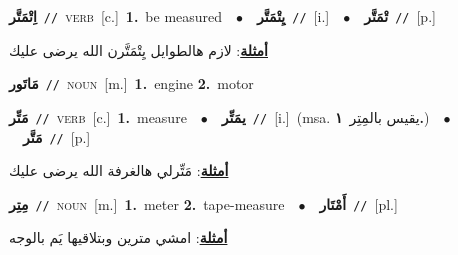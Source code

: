 \documentclass[10pt,a4paper,twoside]{article} %
\begin{document}
\begin{multicols}{2}
{{\setlength\topsep{0pt}\textbf{\foreignlanguage{arabic}{اِتْمَتَّر}}\ {\color{gray}\texttt{//}\color{black}}\ \textsc{verb}\ [c.]\ \textbf{1.}~be measured\ \ $\bullet$\ \ \setlength\topsep{0pt}\textbf{\foreignlanguage{arabic}{يِتْمَتَّر}}\ {\color{gray}\texttt{//}\color{black}}\ [i.]\ \ $\bullet$\ \ \setlength\topsep{0pt}\textbf{\foreignlanguage{arabic}{تْمَتَّر}}\ {\color{gray}\texttt{//}\color{black}}\ [p.]\  \begin{flushright}\color{gray}\foreignlanguage{arabic}{\textbf{\underline{\foreignlanguage{arabic}{أمثلة}}}: لازم هالطوايل يِتْمَتَّرن الله يرضى عليك}\end{flushright}\color{black}} \vspace{2mm}

{\setlength\topsep{0pt}\textbf{\foreignlanguage{arabic}{مَاتَور}}\ {\color{gray}\texttt{//}\color{black}}\ \textsc{noun}\ [m.]\ \textbf{1.}~engine  \textbf{2.}~motor\ 

{\setlength\topsep{0pt}\textbf{\foreignlanguage{arabic}{مَتِّر}}\ {\color{gray}\texttt{//}\color{black}}\ \textsc{verb}\ [c.]\ \textbf{1.}~measure\ \ $\bullet$\ \ \setlength\topsep{0pt}\textbf{\foreignlanguage{arabic}{يمَتِّر}}\ {\color{gray}\texttt{//}\color{black}}\ [i.]\ \color{gray}(msa. \foreignlanguage{arabic}{يقيس بالمِتِر}~\foreignlanguage{arabic}{\textbf{١.}})\color{black}\ \ $\bullet$\ \ \setlength\topsep{0pt}\textbf{\foreignlanguage{arabic}{مَتَّر}}\ {\color{gray}\texttt{//}\color{black}}\ [p.]\  \begin{flushright}\color{gray}\foreignlanguage{arabic}{\textbf{\underline{\foreignlanguage{arabic}{أمثلة}}}: مَتِّرلي هالغرفة الله يرضى عليك}\end{flushright}\color{black}} \vspace{2mm}

{\setlength\topsep{0pt}\textbf{\foreignlanguage{arabic}{مِتِر}}\ {\color{gray}\texttt{//}\color{black}}\ \textsc{noun}\ [m.]\ \textbf{1.}~meter  \textbf{2.}~tape-measure\ \ $\bullet$\ \ \setlength\topsep{0pt}\textbf{\foreignlanguage{arabic}{أَمْتَار}}\ {\color{gray}\texttt{//}\color{black}}\ [pl.]\  \begin{flushright}\color{gray}\foreignlanguage{arabic}{\textbf{\underline{\foreignlanguage{arabic}{أمثلة}}}: امشي مترين وبتلاقيها يَم بالوجه}\end{flushright}\color{black}} \vspace{2mm}

}}
\end{multicols}
\end{document}
